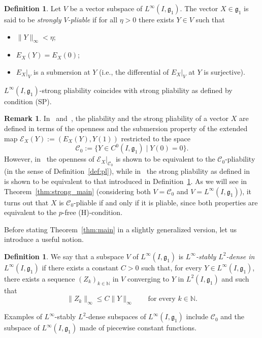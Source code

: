 \documentclass[10pt,a4paper]{amsart}
\numberwithin{equation}{section}
\theoremstyle{definition}
\newtheorem{Definition}[Theorem]{Definition}
\newtheorem{Remark}[Theorem]{Remark}
\begin{document}
\begin{Definition}\label{def:strongpl}
 Let $V$ be a vector subspace of $L^\infty(I,{\mathfrak g}_1)$. The vector $X\in{\mathfrak g}_1$ is said to be \emph{strongly $V$-pliable} if for all $\eta>0$ there exists $Y\in V$ such that
 \begin{itemize}\itemsep=0pt
 	\item[(i)] $\|Y\|_\infty<\eta$;
 	\item[(ii)] $E_X(Y)=E_X(0)$;
 	\item[(iii)] $E_X|_V$ is a submersion at $Y$ (i.e., the differential of $E_X|_V$ at $Y$ is surjective).
 \end{itemize}
 $L^\infty(I,{\mathfrak g}_1)$-strong pliability coincides with strong pliability as defined by condition (SP).
\end{Definition}

\begin{Remark}\label{rem:plia-F}In~\cite[Definition 3.4]{Juillet-Sigalotti} and~\cite[Definition~4.1]{SS18}, the pliability
and the strong pliability
of
a vector $X$ are defined in terms of the openness
and the submersion property
of the
extended map $\mathcal{E}_X(Y):=(E_X(Y),Y(1))$ restricted to the space
\[
\mathcal C_0:=\bigl\{Y\in C^0(I,{\mathfrak g}_1)\mid Y(0)=0\bigr\}.
\]
However, in~\cite[Proposition~3.7]{Juillet-Sigalotti}
the openness of $\mathcal{E}_X|_{\mathcal C_0}$ is shown to be equivalent to the $\mathcal C_0$-pliability (in the sense of Definition~\ref{def:pl}), while in~\cite[Lemma~4.2]{SS18}
the strong pliability as defined in~\cite[Definition~4.1]{SS18} is shown to be
equivalent to that introduced in Definition~\ref{def:strongpl}.
As we will see in Theorem~\ref{thm:strong_main} (considering both $V={\mathcal C}_0$ and $V=L^\infty(I,{\mathfrak g}_1)$), it turns out that $X$ is $\mathcal C_0$-pliable if and only if it is pliable, since both properties are equivalent to the $p$-free (H)-condition.
\end{Remark}

Before stating Theorem~\ref{thm:main} in a slightly generalized version, let us introduce a useful notion.

\begin{Definition}\label{def:stabledensity}
We say that a subspace $V$ of $L^\infty(I,{\mathfrak g}_1)$ is
 \emph{$L^\infty$-stably $L^2$-dense in $L^\infty(I,{\mathfrak g}_1)$}
if there exists a constant $C>0$ such that, for every
$Y\in L^\infty(I,{\mathfrak g}_1)$, there exists a sequence
$(Z_k)_{k\in\mathbb{N}}$ in $V$ converging to $Y$ in $L^2(I,{\mathfrak g}_1)$ and such that
\[
\|Z_k\|_\infty
\le C\|Y\|_\infty
\qquad\text{for every }k\in\mathbb{N}.
\]
\end{Definition}
Examples of $L^\infty$-stably $L^2$-dense subspaces of $L^\infty(I,{\mathfrak g}_1)$
include $\mathcal{C}_0$ and the subspace of $L^\infty(I,{\mathfrak g}_1)$ made of piecewise constant functions.
\end{document}
